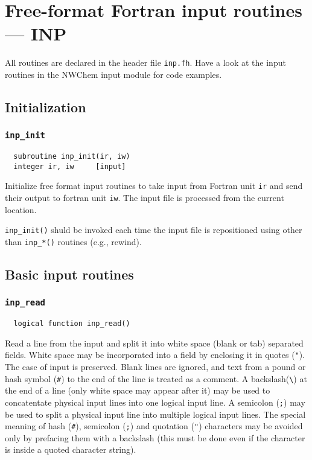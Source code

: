 \section{Free-format Fortran input routines --- INP}

 All routines are declared in the header file {\tt inp.fh}.
Have a look at the input routines in the NWChem input module
for code examples.

\subsection{Initialization}

\subsubsection{{\tt inp\_init}}

\begin{verbatim}
  subroutine inp_init(ir, iw)
  integer ir, iw     [input]
\end{verbatim}
Initialize free format input routines to take input from Fortran unit
{\tt ir} and send their output to fortran unit {\tt iw}.  The input
file is processed from the current location.

{\tt inp\_init()} shuld be invoked each time the input file is
repositioned using other than {\tt inp\_*()} routines (e.g., rewind).

\subsection{Basic input routines}

\subsubsection{{\tt inp\_read}}
\begin{verbatim}
  logical function inp_read()
\end{verbatim}
Read a line from the input and split it into white space (blank or
tab) separated fields.  White space may be incorporated into a field
by enclosing it in quotes (\verb+"+).  The case of input is preserved.
Blank lines are ignored, and text from a pound or hash symbol
(\verb+#+) to the end of the line is treated as a comment.  A
backslash(\verb+\+) at the end of a line (only white space may appear
after it) may be used to concatentate physical input lines into one
logical input line.  A semicolon (\verb+;+) may be used to split a
physical input line into multiple logical input lines.  The special
meaning of hash (\verb+#+), semicolon (\verb+;+) and quotation
(\verb+"+) characters may be avoided only by prefacing them with a
backslash (this must be done even if the character is inside a quoted
character string).

